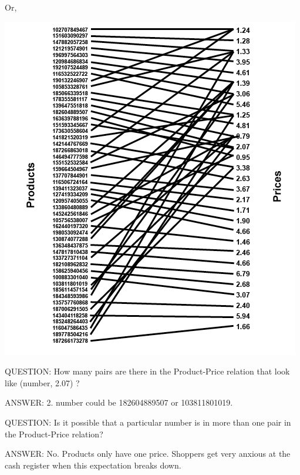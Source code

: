 \documentclass{ximera}
\begin{document}
Or,

\begin{image}
\includegraphics{pics/Product_Price_Map.png}
\end{image}




\begin{dialogue}
\item[QUESTION:] How many pairs are there in the Product-Price relation that look like (number, 2.07) ? \\
\item[ANSWER:] 2. number could be 182604889507 or 103811801019. \\
\end{dialogue}

\begin{dialogue}
\item[QUESTION:] Is it possible that a particular number is in more than one pair in the Product-Price relation? \\
\item[ANSWER:] No. Products only have one price.  Shoppers get very anxious at the cash register when this expectation breaks down. \\
\end{dialogue}
\end{document}
